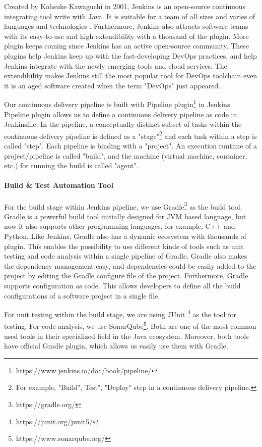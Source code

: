 \par
Created by Kohsuke Kawaguchi in 2001, Jenkins is an open-source continuous integrating tool write with Java. It is suitable for a team of all sizes and varies of languages and technologies \cite{smart2011jenkins}. Furthermore, Jenkins also attracts software teams with its easy-to-use and high extendibility \cite{smart2011jenkins} with a thousand of the plugin. More plugin keeps coming since Jenkins has an active open-source community. These plugins help Jenkins keep up with the fast-developing DevOps practices, and help Jenkins integrate with the newly emerging tools and cloud services. The extendibility makes Jenkins still the most popular tool for DevOps toolchain even it is an aged software created when the term "DevOps" just appeared.
\par
Our continuous delivery pipeline is built with Pipeline plugin\footnote{https://www.jenkins.io/doc/book/pipeline/} in Jenkins.
Pipeline plugin allows us to define a continuous delivery pipeline as code in Jenkinsfile.
In the pipeline, a conceptually distinct subset of tasks within the continuous delivery pipeline \cite{Pipeline85:online} is defined as a "stage"\footnote{For example, "Build", Test", "Deploy" step in a continuous delivery pipeline.} and each task within a step is called "step". Each pipeline is binding with a "project". An execution runtime of a project/pipeline is called "build", and the machine (virtual machine, container, etc.) for running the build is called "agent".
\paragraph[]{Build \& Test Automation Tool}
For the build stage within Jenkins pipeline, we use Gradle\footnote{https://gradle.org/} as the build tool.
Gradle is a powerful build tool initially designed for JVM based language, but now it also supports other programming languages, for example, C++ and Python. Like Jenkins, Gradle also has a dynamic ecosystem with thousands of plugin. This enables the possibility to use different kinds of tools such as unit testing and code analysis within a single pipeline of Gradle. Gradle also makes the dependency management easy, and dependencies could be easily added to the project by editing the Gradle configure file of the project. Furthermore, Gradle supports configuration as code. This allows developers to define all the build configurations of a software project in a single file.
\par
For unit testing within the build stage, we are using JUnit \footnote{https://junit.org/junit5/} as the tool for testing. For code analysis, we use SonarQube\footnote{https://www.sonarqube.org/}. Both are one of the most common used tools in their specialized field in the Java ecosystem. Moreover, both tools have official Gradle plugin, which allows us easily use them with Gradle.
